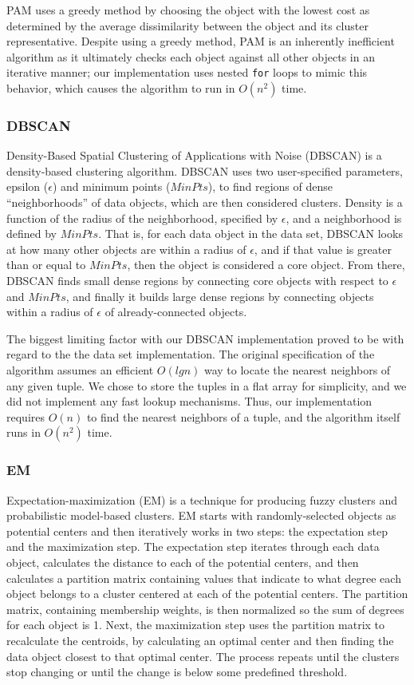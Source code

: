 \documentclass[11pt,letterpaper]{article}
\begin{document}
PAM uses a greedy method by choosing the object with the lowest cost as determined by the average dissimilarity between the object and its cluster representative.  Despite using a greedy method, PAM is an inherently inefficient algorithm as it ultimately checks each object against all other objects in an iterative manner; our implementation uses nested \verb+for+ loops to mimic this behavior, which causes the algorithm to run in $O(n^{2})$ time.

\subsubsection{DBSCAN} 
Density-Based Spatial Clustering of Applications with Noise (DBSCAN) is a density-based clustering algorithm. DBSCAN uses two user-specified parameters, epsilon ($\epsilon$) and minimum points ($MinPts$), to find regions of dense ``neighborhoods'' of data objects, which are then considered clusters.  Density is a function of the radius of the neighborhood, specified by $\epsilon$, and a neighborhood is defined by $MinPts$.  That is, for each data object in the data set, DBSCAN looks at how many other objects are within a radius of $\epsilon$, and if that value is greater than or equal to $MinPts$, then the object is considered a core object.  From there, DBSCAN finds small dense regions by connecting core objects with respect to $\epsilon$ and $MinPts$, and finally it builds large dense regions by connecting objects within a radius of $\epsilon$ of already-connected objects.

The biggest limiting factor with our DBSCAN implementation proved to be with regard to the the data set implementation.
The original specification of the algorithm assumes an efficient $O(lg n)$ way to locate the nearest neighbors of any given
tuple.  We chose to store the tuples in a flat array for simplicity, and we did not implement any fast lookup mechanisms.
Thus, our implementation requires $O(n)$ to find the nearest neighbors of a tuple, and the algorithm itself runs in $O(n^2)$ time.

\subsubsection{EM} 
Expectation-maximization (EM) is a technique for producing fuzzy clusters and probabilistic model-based clusters.  EM starts with randomly-selected objects as potential centers and then iteratively works in two steps:  the expectation step and the maximization step.  The expectation step iterates through each data object, calculates the distance to each of the potential centers, and then calculates a partition matrix containing values that indicate to what degree each object belongs to a cluster centered at each of the potential centers.  The partition matrix, containing membership weights, is then normalized so the sum of degrees for each object is 1.  Next, the maximization step uses the partition matrix to recalculate the centroids, by calculating an optimal center and then finding the data object closest to that optimal center.  The process repeats until the clusters stop changing or until the change is below some predefined threshold.
\end{document}
